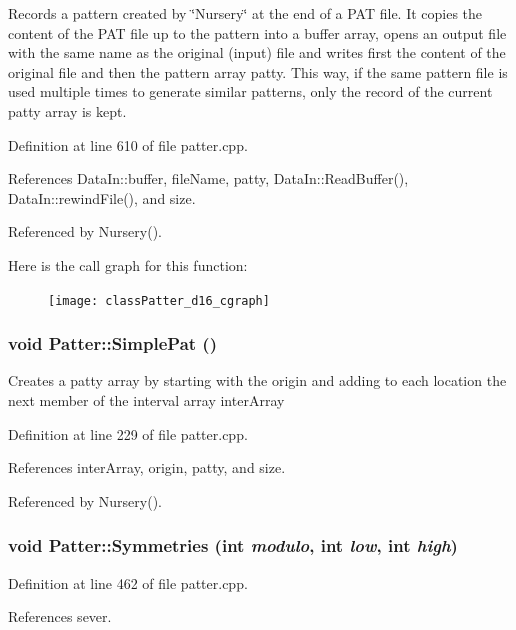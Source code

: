 Records a pattern created by \char`\"{}Nursery\char`\"{} at the end of a PAT file. It copies the content of the PAT file up to the pattern into a buffer array, opens an output file with the same name as the original (input) file and writes first the content of the original file and then the pattern array patty. This way, if the same pattern file is used multiple times to generate similar patterns, only the record of the current patty array is kept. 

Definition at line 610 of file patter.cpp.

References Data\-In::buffer, file\-Name, patty, Data\-In::Read\-Buffer(), Data\-In::rewind\-File(), and size.

Referenced by Nursery().

Here is the call graph for this function:\begin{figure}[H]
\begin{center}
\leavevmode
\texttt{[image: classPatter\_d16\_cgraph]}
\end{center}
\end{figure}
\subsubsection{\setlength{\rightskip}{0pt plus 5cm}void Patter::Simple\-Pat ()\hspace{0.3cm}{\tt  [private]}}\label{classPatter_d2}


Creates a patty array by starting with the origin and adding to each location the next member of the interval array inter\-Array 

Definition at line 229 of file patter.cpp.

References inter\-Array, origin, patty, and size.

Referenced by Nursery().
\subsubsection{\setlength{\rightskip}{0pt plus 5cm}void Patter::Symmetries (int {\em modulo}, int {\em low}, int {\em high})\hspace{0.3cm}{\tt  [private]}}\label{classPatter_d9}




Definition at line 462 of file patter.cpp.

References sever.

